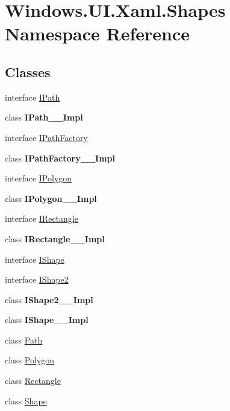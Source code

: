 \hypertarget{namespace_windows_1_1_u_i_1_1_xaml_1_1_shapes}{}\section{Windows.\+U\+I.\+Xaml.\+Shapes Namespace Reference}
\label{namespace_windows_1_1_u_i_1_1_xaml_1_1_shapes}
\subsection*{Classes}
\begin{DoxyCompactItemize}
\item 
interface \hyperlink{interface_windows_1_1_u_i_1_1_xaml_1_1_shapes_1_1_i_path}{I\+Path}
\item 
class {\bfseries I\+Path\+\_\+\+\_\+\+Impl}
\item 
interface \hyperlink{interface_windows_1_1_u_i_1_1_xaml_1_1_shapes_1_1_i_path_factory}{I\+Path\+Factory}
\item 
class {\bfseries I\+Path\+Factory\+\_\+\+\_\+\+Impl}
\item 
interface \hyperlink{interface_windows_1_1_u_i_1_1_xaml_1_1_shapes_1_1_i_polygon}{I\+Polygon}
\item 
class {\bfseries I\+Polygon\+\_\+\+\_\+\+Impl}
\item 
interface \hyperlink{interface_windows_1_1_u_i_1_1_xaml_1_1_shapes_1_1_i_rectangle}{I\+Rectangle}
\item 
class {\bfseries I\+Rectangle\+\_\+\+\_\+\+Impl}
\item 
interface \hyperlink{interface_windows_1_1_u_i_1_1_xaml_1_1_shapes_1_1_i_shape}{I\+Shape}
\item 
interface \hyperlink{interface_windows_1_1_u_i_1_1_xaml_1_1_shapes_1_1_i_shape2}{I\+Shape2}
\item 
class {\bfseries I\+Shape2\+\_\+\+\_\+\+Impl}
\item 
class {\bfseries I\+Shape\+\_\+\+\_\+\+Impl}
\item 
class \hyperlink{class_windows_1_1_u_i_1_1_xaml_1_1_shapes_1_1_path}{Path}
\item 
class \hyperlink{class_windows_1_1_u_i_1_1_xaml_1_1_shapes_1_1_polygon}{Polygon}
\item 
class \hyperlink{class_windows_1_1_u_i_1_1_xaml_1_1_shapes_1_1_rectangle}{Rectangle}
\item 
class \hyperlink{class_windows_1_1_u_i_1_1_xaml_1_1_shapes_1_1_shape}{Shape}
\end{DoxyCompactItemize}
